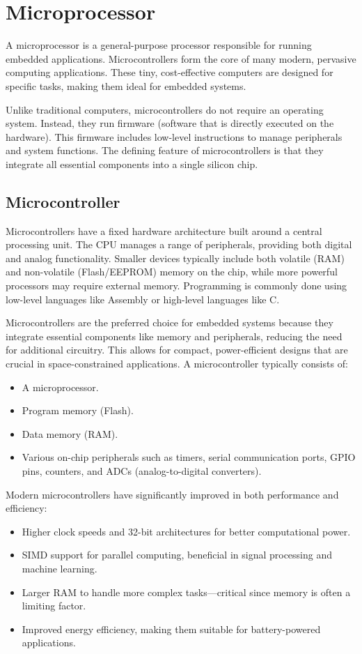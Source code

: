 \section{Microprocessor}

A microprocessor is a general-purpose processor responsible for running embedded applications.
Microcontrollers form the core of many modern, pervasive computing applications. 
These tiny, cost-effective computers are designed for specific tasks, making them ideal for embedded systems.

Unlike traditional computers, microcontrollers do not require an operating system. 
Instead, they run firmware (software that is directly executed on the hardware). 
This firmware includes low-level instructions to manage peripherals and system functions.
The defining feature of microcontrollers is that they integrate all essential components into a single silicon chip.

\subsection{Microcontroller}
Microcontrollers have a fixed hardware architecture built around a central processing unit. 
The CPU manages a range of peripherals, providing both digital and analog functionality.
Smaller devices typically include both volatile (RAM) and non-volatile (Flash/EEPROM) memory on the chip, while more powerful processors may require external memory.
Programming is commonly done using low-level languages like Assembly or high-level languages like C.

Microcontrollers are the preferred choice for embedded systems because they integrate essential components like memory and peripherals, reducing the need for additional circuitry. 
This allows for compact, power-efficient designs that are crucial in space-constrained applications.
A microcontroller typically consists of:
\begin{itemize}
    \item A microprocessor.
    \item Program memory (Flash).
    \item Data memory (RAM).
    \item Various on-chip peripherals such as timers, serial communication ports, GPIO pins, counters, and ADCs (analog-to-digital converters).
\end{itemize}

Modern microcontrollers have significantly improved in both performance and efficiency:
\begin{itemize}
    \item Higher clock speeds and 32-bit architectures for better computational power.
    \item SIMD support for parallel computing, beneficial in signal processing and machine learning.
    \item Larger RAM to handle more complex tasks—critical since memory is often a limiting factor.
    \item Improved energy efficiency, making them suitable for battery-powered applications.
\end{itemize}


